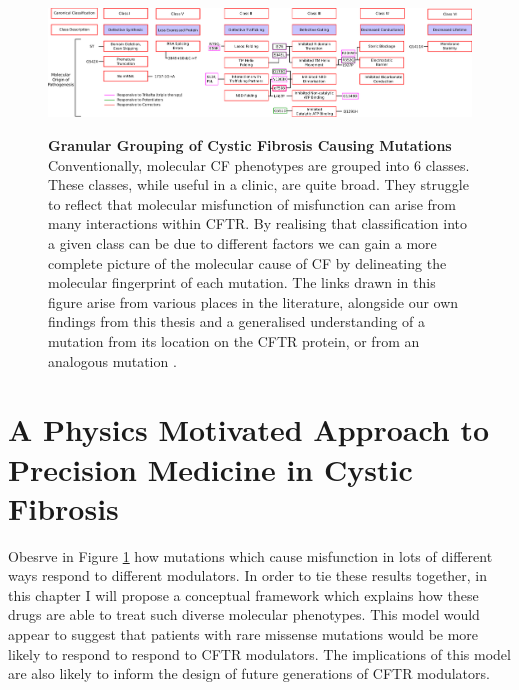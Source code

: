 \begin{landscape}
\begin{figure}
	\begin{center}
	\includegraphics[width=1.5\textwidth]{figures/perspective/classes_mutations.pdf}\\
	\end{center}
	\captionsetup{singlelinecheck = false, justification=raggedright}
	\caption[Granular grouping of CF pathogenesis]{\textbf{Granular Grouping of Cystic Fibrosis Causing Mutations}{ Conventionally, molecular CF phenotypes are grouped into 6 classes. These classes, while useful in a clinic, are quite broad. They struggle to reflect that molecular misfunction of misfunction can arise from many interactions within CFTR. By realising that classification into a given class can be due to different factors we can gain a more complete picture of the molecular cause of CF by delineating the molecular fingerprint of each mutation. The links drawn in this figure arise from various places in the literature, alongside our own findings from this thesis and a generalised understanding of a mutation from its location on the CFTR protein, or from an analogous mutation \cite{bompadre2007, gong2004, wong2022, vangoor2009, vangoor2014, hoffmann2018, thelin2007, gene2008, trikafta_website, phuan2018, ensinck2022}.}
	}

	\label{granular_classification}
\end{figure}
\end{landscape}


\section{A Physics Motivated Approach to Precision Medicine in Cystic Fibrosis}
Obesrve in Figure \ref{granular_classification} how mutations which cause misfunction in lots of different ways respond to different modulators. In order to tie these results together, in this chapter I will propose a conceptual framework which explains how these drugs are able to treat such diverse molecular phenotypes. This model would appear to suggest that patients with rare missense mutations would be more likely to respond to respond to CFTR modulators. The implications of this model are also likely to inform the design of future generations of CFTR modulators. 

